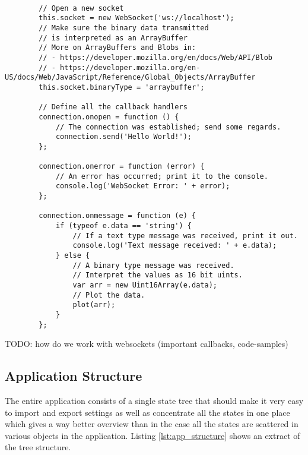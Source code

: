 \begin{tcolorbox}[
        title={
            \refstepcounter{listing}
            Listing \thelisting: JavaScript ``Get 2D Rendering Context''
            \label{lst:js2dcontext}
            \addcontentsline{lol}{listing}{\protect\numberline{\thelisting}}
        }
    ]
    \begin{verbatim}

        // Open a new socket
        this.socket = new WebSocket('ws://localhost');
        // Make sure the binary data transmitted
        // is interpreted as an ArrayBuffer
        // More on ArrayBuffers and Blobs in:
        // - https://developer.mozilla.org/en/docs/Web/API/Blob
        // - https://developer.mozilla.org/en-US/docs/Web/JavaScript/Reference/Global_Objects/ArrayBuffer
        this.socket.binaryType = 'arraybuffer';

        // Define all the callback handlers
        connection.onopen = function () {
            // The connection was established; send some regards.
            connection.send('Hello World!');
        };

        connection.onerror = function (error) {
            // An error has occurred; print it to the console.
            console.log('WebSocket Error: ' + error);
        };

        connection.onmessage = function (e) {
            if (typeof e.data == 'string') {
                // If a text type message was received, print it out.
                console.log('Text message received: ' + e.data);
            } else {
                // A binary type message was received.
                // Interpret the values as 16 bit uints.
                var arr = new Uint16Array(e.data);
                // Plot the data.
                plot(arr);
            }
        };
    \end{verbatim}
\end{tcolorbox}

TODO: how do we work with websockets (important callbacks, code-samples)

\subsection{Application Structure}

The entire application consists of a single state tree that should make it very easy to import and export settings as well as concentrate all the states in one place which gives a way better overview than in the case all the states are scattered in various objects in the application.
Listing \ref{lst:app_structure} shows an extract of the tree structure.

